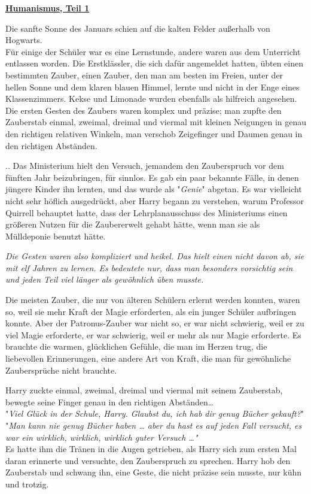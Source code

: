 

\hypertarget{humanismus-teil-1}{%

\textbf{\uline{Humanismus, Teil 1}}

Die sanfte Sonne des Januars schien auf die kalten Felder außerhalb von Hogwarts.\\ Für einige der Schüler war es eine Lernstunde, andere waren aus dem Unterricht entlassen worden. Die Erstklässler, die sich dafür angemeldet hatten, übten einen bestimmten Zauber, einen Zauber, den man am besten im Freien, unter der hellen Sonne und dem klaren blauen Himmel, lernte und nicht in der Enge eines Klassenzimmers. Kekse und Limonade wurden ebenfalls als hilfreich angesehen. Die ersten Gesten des Zaubers waren komplex und präzise; man zupfte den Zauberstab einmal, zweimal, dreimal und viermal mit kleinen Neigungen in genau den richtigen relativen Winkeln, man verschob Zeigefinger und Daumen genau in den richtigen Abständen.

.. Das Ministerium hielt den Versuch, jemandem den Zauberspruch vor dem fünften Jahr beizubringen, für sinnlos. Es gab ein paar bekannte Fälle, in denen jüngere Kinder ihn lernten, und das wurde als "\emph{Genie}" abgetan. Es war vielleicht nicht sehr höflich ausgedrückt, aber Harry begann zu verstehen, warum Professor Quirrell behauptet hatte, dass der Lehrplanausschuss des Ministeriums einen größeren Nutzen für die Zaubererwelt gehabt hätte, wenn man sie als Mülldeponie benutzt hätte.

\emph{Die Gesten waren also kompliziert und heikel. Das hielt einen nicht davon ab, sie mit elf Jahren zu lernen. Es bedeutete nur, dass man besonders vorsichtig sein und jeden Teil viel länger als gewöhnlich üben musste.}

Die meisten Zauber, die nur von älteren Schülern erlernt werden konnten, waren so, weil sie mehr Kraft der Magie erforderten, als ein junger Schüler aufbringen konnte. Aber der Patronus-Zauber war nicht so, er war nicht schwierig, weil er zu viel Magie erforderte, er war schwierig, weil er mehr als nur Magie erforderte. Es brauchte die warmen, glücklichen Gefühle, die man im Herzen trug, die liebevollen Erinnerungen, eine andere Art von Kraft, die man für gewöhnliche Zaubersprüche nicht brauchte.

Harry zuckte einmal, zweimal, dreimal und viermal mit seinem Zauberstab, bewegte seine Finger genau in den richtigen Abständen…\\ "\emph{Viel Glück in der Schule, Harry. Glaubst du, ich hab dir genug Bücher gekauft?}"\\ "\emph{Man kann nie genug Bücher haben … aber du hast es auf jeden Fall versucht, es war ein wirklich, wirklich, wirklich guter Versuch …"}\\ Es hatte ihm die Tränen in die Augen getrieben, als Harry sich zum ersten Mal daran erinnerte und versuchte, den Zauberspruch zu sprechen. Harry hob den Zauberstab und schwang ihn, eine Geste, die nicht präzise sein musste, nur kühn und trotzig.

}
